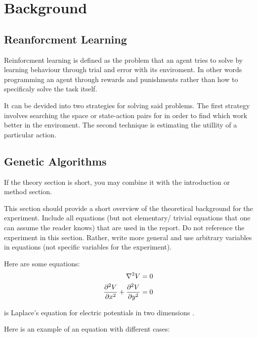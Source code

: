 \section{Background}

\subsection{Reanforcment Learning}

Reinforcment learning is defined as the problem that an agent tries to solve by learning behaviour through trial and error with its enviroment. In other words programming an agent through rewards and punishments rather than how to specificaly solve the task itself\cite{kaelbling1996reinforcement}.

It can be devided into two strategies for solving said problems. The first strategy involves searching the space or state-action pairs for in order to find which work better in the enviroment. The second technique is estimating the utillity of a particular action. 
\subsection{Genetic Algorithms}

If the theory section is short, you may combine it with the introduction or method section. \par

This section should provide a short overview of the theoretical background for the experiment. Include all equations (but not elementary/ trivial equations that one can assume the reader knows) that are used in the report. Do not reference the experiment in this section. Rather, write more general and use arbitrary variables in equations (not specific variables for the experiment). \par

Here are some equations:
\begin{align} %
    \laplacian{V} &=0 \nonumber \\
    \frac{\partial^2 V}{\partial x^2}+\dpd[2]{V}{y} &=0 \label{eq:Laplace} %
\end{align}

is Laplace's equation for electric potentials in two dimensions \parencite[131,136]{Griffiths}. \par
Here is an example of an equation with different cases:

